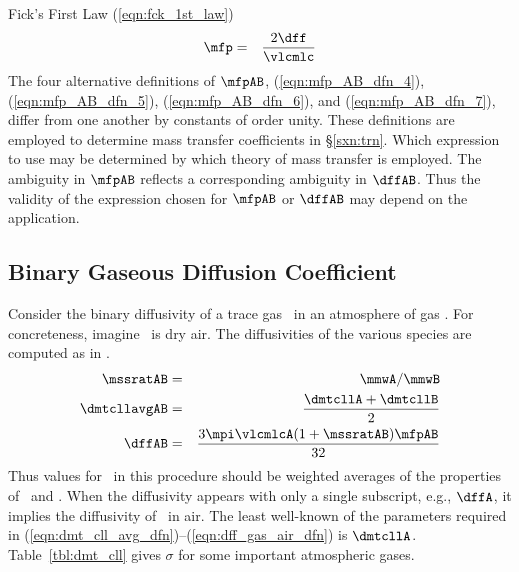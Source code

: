 \documentclass[12pt,twoside]{book}
\begin{document}
Fick's First Law (\ref{eqn:fck_1st_law})
\begin{eqnarray}
\mfp & = & \frac{2 \dff}{\vlcmlc } 
\label{eqn:mfp_AB_dfn_7}
\end{eqnarray}
The four alternative definitions of $\mfpAB$, 
(\ref{eqn:mfp_AB_dfn_4}), (\ref{eqn:mfp_AB_dfn_5}),
(\ref{eqn:mfp_AB_dfn_6}), and (\ref{eqn:mfp_AB_dfn_7}),  
differ from one another by constants of order unity.
These definitions are employed to determine mass transfer
coefficients in \S\ref{sxn:trn}. 
Which expression to use may be determined by which theory of mass
transfer is employed. 
The ambiguity in $\mfpAB$ reflects a corresponding ambiguity in $\dffAB$.
Thus the validity of the expression chosen for $\mfpAB$ or $\dffAB$
may depend on the application.

\subsection[Binary Gaseous Diffusion Coefficient]{Binary Gaseous Diffusion Coefficient}\label{sxn:dff}
Consider the binary diffusivity of a trace gas \A\ in an atmosphere
of gas \B.
For concreteness, imagine \B\ is dry air.
The diffusivities of the various species are computed as in
\cite{SeP97}.
\begin{eqnarray}
\mssratAB & = & \mmwA / \mmwB \\
\label{eqn:dmt_cll_avg_dfn}
\dmtcllavgAB & = & \frac{\dmtcllA + \dmtcllB}{2} \\ %
\label{eqn:dff_gas_air_dfn}
\dffAB & = & \frac{3 \mpi \vlcmlcA (1 + \mssratAB) \mfpAB}{32} %
\end{eqnarray}
Thus values for \B\ in this procedure should be weighted averages of
the properties of \Nd\ and \Od. 
When the diffusivity appears with only a single subscript, e.g.,
$\dffA$, it implies the diffusivity of \A\ in air.
The least well-known of the parameters required in 
(\ref{eqn:dmt_cll_avg_dfn})--(\ref{eqn:dff_gas_air_dfn}) is
$\dmtcllA$. 
Table~\ref{tbl:dmt_cll} gives $\sigma$ for some important atmospheric
gases.
\end{document}
